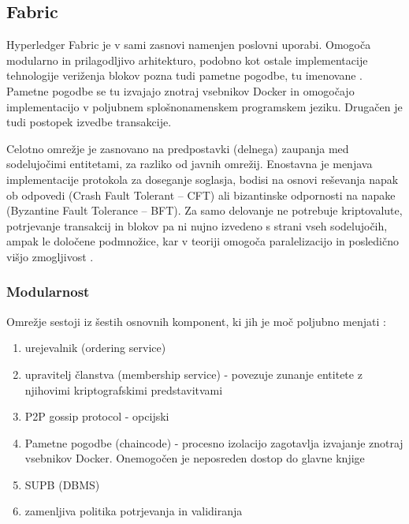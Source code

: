 \documentclass[a4paper, 12pt]{book}
\begin{document}
\subsection{Fabric}
Hyperledger Fabric je v sami zasnovi namenjen poslovni uporabi.
Omogoča modularno in prilagodljivo arhitekturo, podobno kot ostale implementacije tehnologije veriženja blokov pozna tudi pametne pogodbe, tu imenovane .
Pametne pogodbe se tu izvajajo znotraj vsebnikov Docker in omogočajo implementacijo v poljubnem splošnonamenskem programskem jeziku.
Drugačen je tudi postopek izvedbe transakcije.

Celotno omrežje je zasnovano na predpostavki (delnega) zaupanja med sodelujočimi entitetami, za razliko od javnih omrežij.
Enostavna je menjava implementacije protokola za doseganje soglasja, bodisi na osnovi reševanja napak ob odpovedi (Crash Fault Tolerant -- CFT) ali bizantinske odpornosti na napake (Byzantine Fault Tolerance -- BFT).
Za samo delovanje ne potrebuje kriptovalute, potrjevanje transakcij in blokov pa ni nujno izvedeno s strani vseh sodelujočih, ampak le določene podmnožice, kar v teoriji omogoča paralelizacijo in posledično višjo zmogljivost \cite{hyperledgerDocs}.

\subsubsection{Modularnost}
Omrežje sestoji iz šestih osnovnih komponent, ki jih je moč poljubno menjati \cite{hyperledgerDocs}:
\begin{enumerate}
	\item urejevalnik (ordering service)
	\item upravitelj članstva (membership service) - povezuje zunanje entitete z njihovimi kriptografskimi predstavitvami
	\item P2P gossip protocol - opcijski
	\item Pametne pogodbe (chaincode) - procesno izolacijo zagotavlja izvajanje znotraj vsebnikov Docker. 
	Onemogočen je neposreden dostop do glavne knjige
	\item SUPB (DBMS)
	\item zamenljiva politika potrjevanja in validiranja
\end{enumerate}
\end{document}
